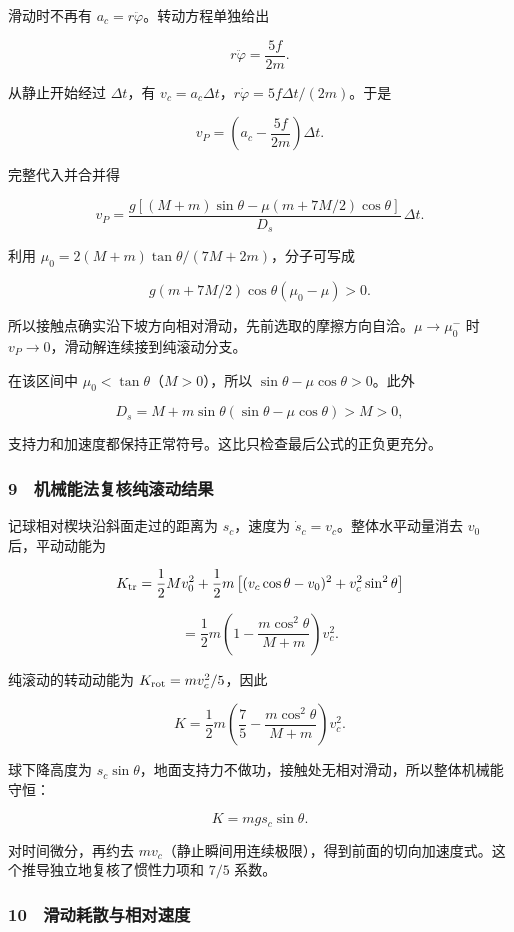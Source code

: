 \documentclass[12pt,a4paper,fontset=fandol]{ctexart}
\begin{document}
滑动时不再有 \(a_c=r\ddot\varphi\)。转动方程单独给出

\[r\ddot\varphi=\frac{5f}{2m}.\]

从静止开始经过 \(\Delta t\)，有
\(v_c=a_c\Delta t\)，\(r\dot\varphi=5f\Delta t/(2m)\)。于是

\[v_P=\left(a_c-\frac{5f}{2m}\right)\Delta t.\]

完整代入并合并得

\[\boxed{v_P=
\frac{g[(M+m)\sin\theta-\mu(m+7M/2)\cos\theta]}{D_s}\,\Delta t.}\]

利用 \(\mu_0=2(M+m)\tan\theta/(7M+2m)\)，分子可写成

\[g(m+7M/2)\cos\theta(\mu_0-\mu)>0.\]

所以接触点确实沿下坡方向相对滑动，先前选取的摩擦方向自洽。\(\mu\to\mu_0^-\)
时 \(v_P\to0\)，滑动解连续接到纯滚动分支。

在该区间中 \(\mu_0<\tan\theta\)（\(M>0\)），所以
\(\sin\theta-\mu\cos\theta>0\)。此外

\[D_s=M+m\sin\theta(\sin\theta-\mu\cos\theta)>M>0,\]

支持力和加速度都保持正常符号。这比只检查最后公式的正负更充分。

\subsubsection{9　机械能法复核纯滚动结果}\label{ux673aux68b0ux80fdux6cd5ux590dux6838ux7eafux6edaux52a8ux7ed3ux679c}

记球相对楔块沿斜面走过的距离为 \(s_c\)，速度为
\(\dot s_c=v_c\)。整体水平动量消去 \(v_0\) 后，平动动能为

\[K_{\rm tr}=\frac12Mv_0^2+\frac12m
\left[(v_c\cos\theta-v_0)^2+v_c^2\sin^2\theta\right]\]

\[=\frac12m\left(1-\frac{m\cos^2\theta}{M+m}\right)v_c^2.\]

纯滚动的转动动能为 \(K_{\rm rot}=mv_c^2/5\)，因此

\[K=\frac12m\left(\frac75-\frac{m\cos^2\theta}{M+m}\right)v_c^2.\]

球下降高度为
\(s_c\sin\theta\)，地面支持力不做功，接触处无相对滑动，所以整体机械能守恒：

\[K=mg s_c\sin\theta.\]

对时间微分，再约去
\(mv_c\)（静止瞬间用连续极限），得到前面的切向加速度式。这个推导独立地复核了惯性力项和
\(7/5\) 系数。

\subsubsection{10　滑动耗散与相对速度}\label{ux6ed1ux52a8ux8017ux6563ux4e0eux76f8ux5bf9ux901fux5ea6}
\end{document}
